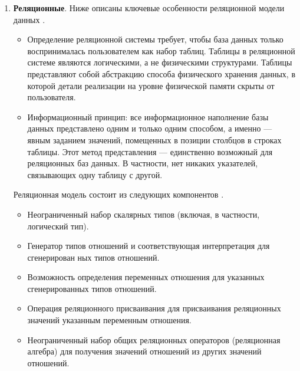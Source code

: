 \begin{enumerate}[label*=\arabic*.]
\begin{enumerate}[label*=\arabic*.]
	\end{enumerate}
	
	\item \textbf{Реляционные}. \newline
	Ниже описаны ключевые особенности реляционной модели данных \cite{Date_old}.
	
	\begin{itemize}[label*=---]
		\item  Определение реляционной системы требует, чтобы база данных только воспринималась пользователем как набор таблиц. Таблицы в реляционной системе являются логическими, а не физическими структурами. Таблицы представляют собой абстракцию способа физического хранения данных, в которой детали реализации на уровне физической памяти скрыты от пользователя.
		\item  Информационный принцип: все информационное наполнение базы данных представлено одним и только одним способом, а именно --- явным заданием значений, помещенных в позиции столбцов в строках таблицы. Этот метод представления --- единственно возможный для реляционных баз данных. В частности, нет никаких указателей, связывающих одну таблицу с другой.
		
	\end{itemize}
	
	Реляционная модель состоит из следующих компонентов \cite{Date_old}.
	
	\begin{itemize}[label*=---]
		\item  Неограниченный набор скалярных типов (включая, в частности, логический тип).
		\item  Генератор типов отношений и соответствующая интерпретация для сгенерирован ных типов отношений.
		\item  Возможность определения переменных отношения для указанных сгенерированных типов отношений.
		\item  Операция реляционного присваивания для присваивания реляционных значений указанным переменным отношения.
		\item  Неограниченный набор общих реляционных операторов (реляционная алгебра) для получения значений отношений из других значений отношений.
		
	\end{itemize}
	
	

\end{enumerate}
